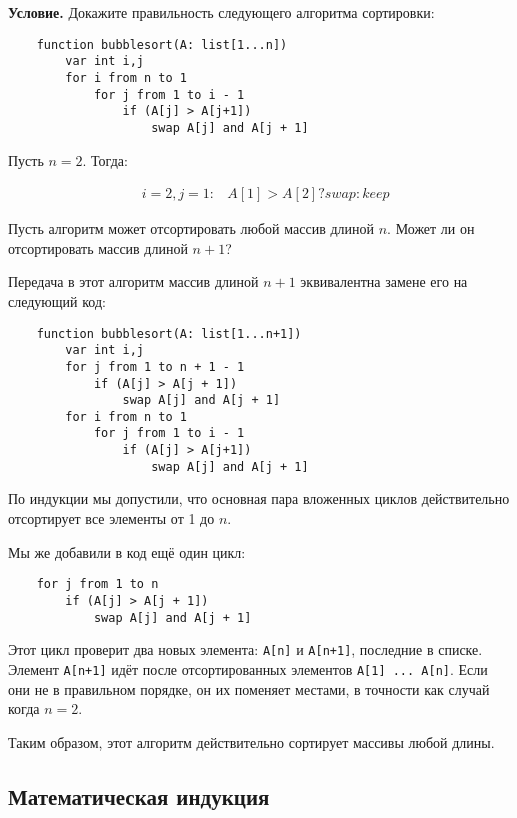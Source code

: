\documentclass{article}
\begin{document}
\textbf{Условие.}
Докажите правильность следующего алгоритма сортировки:

\begin{lstlisting}
    function bubblesort(A: list[1...n])
        var int i,j
        for i from n to 1
            for j from 1 to i - 1
                if (A[j] > A[j+1])
                    swap A[j] and A[j + 1]
\end{lstlisting}

Пусть \(n = 2\).
Тогда:

\begin{eqnarray}
    &i = 2, j = 1:& A[1] > A[2] ? swap : keep
\end{eqnarray}

Пусть алгоритм может отсортировать любой массив длиной \(n\).
Может ли он отсортировать массив длиной \(n+1\)?

Передача в этот алгоритм массив длиной \(n+1\) эквивалентна замене его на следующий код:

\begin{lstlisting}
    function bubblesort(A: list[1...n+1])
        var int i,j
        for j from 1 to n + 1 - 1
            if (A[j] > A[j + 1])
                swap A[j] and A[j + 1]
        for i from n to 1
            for j from 1 to i - 1
                if (A[j] > A[j+1])
                    swap A[j] and A[j + 1]        
\end{lstlisting}

По индукции мы допустили, что основная пара вложенных циклов действительно отсортирует
все элементы от 1 до \(n\).

Мы же добавили в код ещё один цикл:

\begin{lstlisting}
    for j from 1 to n
        if (A[j] > A[j + 1])
            swap A[j] and A[j + 1]
\end{lstlisting}

Этот цикл проверит два новых элемента: \texttt{A[n]} и \texttt{A[n+1]}, последние в списке.
Элемент \texttt{A[n+1]} идёт после отсортированных элементов \texttt{A[1] ... A[n]}.
Если они не в правильном порядке, он их поменяет местами, в точности как случай когда \(n = 2\).

Таким образом, этот алгоритм действительно сортирует массивы любой длины.

\subsection{Математическая индукция}
\end{document}
